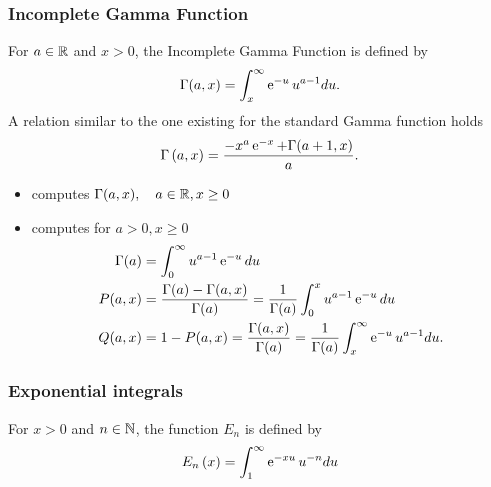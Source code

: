 \subsubsection{Incomplete Gamma Function }

For $a \in {\mathbb R}$ and $x>0$, the Incomplete Gamma Function is defined by
\begin{equation*}
  \Gamma(a, x)=\int_x^{\infty} \operatorname{e}^{ -u } u^{a-1} du.
\end{equation*}
A relation similar to the one existing for the standard Gamma function holds
\begin{equation*}
  \Gamma\left( a, x \right)= \frac{- x^{a} \operatorname{e}^{ -x } + \Gamma (a+1, x)}{a}.
\end{equation*}

\begin{itemize}
\item {}
  \sshortdescribe   computes $\Gamma(a, x), \quad a \in {\mathbb R} , x \geq 0$
\item {}
  \sshortdescribe   computes for $a >0, x \geq 0$
  \begin{align*}
    \Gamma(a)&=\int_0^{\infty} u^{a-1} \operatorname{e}^{ -u }du\\ 
    P(a, x) &= \frac{\Gamma(a) - \Gamma(a, x)}{\Gamma(a)} =
    \frac{1}{\Gamma(a)} \int_0^x u^{a-1} \operatorname{e}^{ -u }  du\\ 
    Q(a, x) &= 1-P(a, x) =\frac{\Gamma(a, x)}{\Gamma(a)} =
    \frac{1}{\Gamma(a)} \int_x^{\infty} \operatorname{e}^{ -u } u^{a-1} du. 
  \end{align*}
\end{itemize}

\subsubsection{Exponential integrals}
For $x>0$ and $n \in {\mathbb N}$, the  function $E_n$ is defined by
\begin{equation*}
  E_n\left( x \right)=\int_{1}^{\infty} \operatorname{e}^{ -x u } u^{-n} du
\end{equation*}

